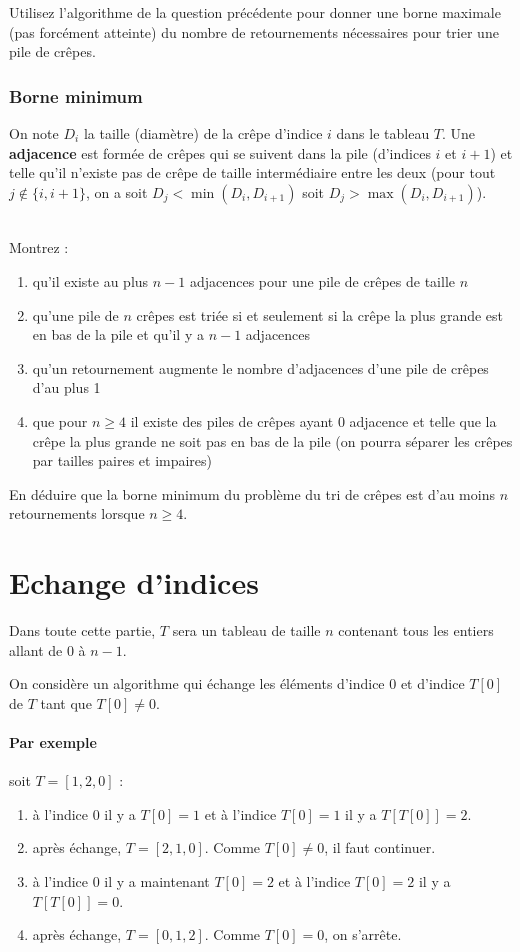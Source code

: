 \documentclass
[12pt]
{article}
\begin{document}
Utilisez l'algorithme de la question précédente pour donner une borne maximale (pas forcément atteinte) du nombre de retournements nécessaires pour trier une pile de crêpes.

\subsubsection{Borne minimum}

On note $D_i$ la taille (diamètre) de la crêpe d'indice $i$ dans le tableau $T$. 
Une {\bf adjacence} est formée de crêpes qui se suivent dans la pile (d'indices $i$ et $i+1$) et telle qu'il n'existe pas de crêpe de taille intermédiaire entre les deux (pour tout $j \notin\{i, i+1\}$, on a soit $D_{j} < \min(D_i, D_{i+1})$ soit $D_{j} > \max(D_i, D_{i+1})$). 

~\\
Montrez : 

\begin{enumerate}
    \item qu'il existe au plus $n-1$ adjacences pour une pile de crêpes de taille $n$
    \item qu'une pile de $n$ crêpes est triée si et seulement si la crêpe la plus grande est en bas de la pile et qu'il y a $n-1$ adjacences
    \item qu'un retournement augmente le nombre d'adjacences d'une pile de crêpes d'au plus 1
    \item que pour $n\geq 4$ il existe des piles de crêpes ayant 0 adjacence et telle que la crêpe la plus grande ne soit pas en bas de la pile (on pourra séparer les crêpes par tailles paires et impaires)
\end{enumerate}

En déduire que la borne minimum du problème du tri de crêpes est d'au moins $n$ retournements lorsque $n \geq 4$.

\section{Echange d'indices}

Dans toute cette partie, $T$ sera un tableau de taille $n$ contenant tous les entiers allant de $0$ à $n-1$.

On considère un algorithme qui échange les éléments d'indice $0$ et d'indice $T[0]$ de $T$ tant que $T[0] \neq 0$.

\paragraph{Par exemple} soit $T = [1, 2, 0]$ :
\begin{enumerate}
    \item à l'indice 0 il y a $T[0] = 1$ et à l'indice $T[0] = 1$ il y a $T[T[0]] = 2$.
    \item après échange, $T = [2, 1, 0]$. Comme $T[0] \neq 0$, il faut continuer.
    \item à l'indice 0 il y a maintenant $T[0] = 2$ et à l'indice $T[0] = 2$ il y a $T[T[0]] = 0$.
    \item après échange, $T = [0, 1, 2]$. Comme $T[0] = 0$, on s'arrête.
\end{enumerate}
\end{document}
